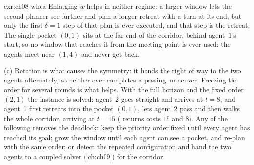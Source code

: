\begin{solution}{exr:ch08-whca}
Enlarging $w$ helps in neither regime: a larger window lets the second planner see further and plan a longer retreat with a turn at its end, but only the first $\delta = 1$ step of that plan is ever executed, and that step is the retreat. The single pocket $(0,1)$ sits at the far end of the corridor, behind agent~1's start, so no window that reaches it from the meeting point is ever used: the agents meet near $(1,4)$ and never get back.

(c) Rotation is what causes the symmetry: it hands the right of way to the two agents alternately, so neither ever completes a passing maneuver. Freezing the order for several rounds is what helps. With the full horizon and the fixed order $(2,1)$ the instance is solved: agent~2 goes straight and arrives at $t = 8$, and agent~1 first retreats into the pocket $(0,1)$, lets agent~2 pass and then walks the whole corridor, arriving at $t = 15$ ( returns costs $15$ and $8$). Any of the following removes the deadlock: keep the priority order fixed until every agent has reached its goal; grow the window until each agent can see a pocket, and re-plan with the same order; or detect the repeated configuration and hand the two agents to a coupled solver (\cref{ch:ch09}) for the corridor.
\end{solution}

